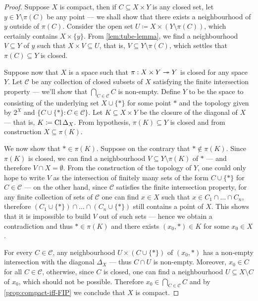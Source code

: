 \begin{proof}
Suppose \(X\) is compact, then if \(C \subseteq X \times Y\) is any closed set,
let \(y \in Y \setminus \pi(C)\) be any point --- we shall show that there
exists a neighbourhood of \(y\) outside of \(\pi(C)\). Consider the open set
\(U \coloneq X \times (Y \setminus \pi(C))\), which certainly contains
\(X \times \{y\}\). From \cref{lem:tube-lemma}, we find a neighbourhood
\(V \subseteq Y\) of \(y\) such that \(X \times V \subseteq U\), that is,
\(V \subseteq Y \setminus \pi(C)\), which settles that \(\pi(C) \subseteq Y\) is
closed.

Suppose now that \(X\) is a space such that \(\pi: X \times Y \twoheadrightarrow Y\) is closed
for any space \(Y\). Let \(\mathcal{C}\) be any collection of closed subsets of
\(X\) satisfying the finite intersection property --- we'll show that
\(\bigcap_{C \in \mathcal{C}} C\) is non-empty. Define \(Y\) to be the space to
consisting of the underlying set \(X \cup \{*\}\) for some point \(*\) and the
topology given by \(2^X\) and \(\{C \cup \{*\} \colon C \in \mathcal{C}\}\). Let
\(K \subseteq X \times Y\) be the closure of the diagonal of \(X\) --- that is,
\(K \coloneq \operatorname{Cl} \Delta_X\). From hypothesis, \(\pi(K) \subseteq Y\) is
closed and from construction \(X \subseteq \pi(K)\).

We now show that \(* \in \pi(K)\). Suppose on the contrary that
\(* \notin \pi(K)\). Since \(\pi(K)\) is closed, we can find a neighbourhood
\(V \subseteq Y \setminus \pi(K)\) of \(*\) --- and therefore
\(V \cap X = \emptyset\). From the construction of the topology of \(Y\), one
could only hope to write \(V\) as the intersection of finitely many sets of the
form \(C \cup \{*\}\) for \(C \in \mathcal{C}\) --- on the other hand, since
\(\mathcal{C}\) satisfies the finite intersection property, for any finite
collection of sets of \(\mathcal{C}\) one can find \(x \in X\) such that
\(x \in C_1 \cap \dots \cap C_n\), therefore
\((C_1 \cup \{*\}) \cap \dots \cap (C_n \cup \{*\})\) still contains a point of
\(X\). This shows that it is impossible to build \(V\) out of such sets ---
hence we obtain a contradiction and thus \(* \in \pi(K)\) and there exists
\((x_0, *) \in K\) for some \(x_0 \in X\).

For every \(C \in \mathcal{C}\), any neighbourhood \(U \times (C \cup \{*\})\)
of \((x_0, *)\) has a non-empty intersection with the diagonal \(\Delta_X\) ---
thus \(C \cap U\) is non-empty. Moreover, \(x_0 \in C\) for all
\(C \in \mathcal{C}\), otherwise, since \(C\) is closed, one can find a
neighbourhood \(U \subseteq X \setminus C\) of \(x_0\), which should not be
possible. Therefore \(x_0 \in \bigcap_{C \in \mathcal{C}} C\) and by
\cref{prop:compact-iff-FIP} we conclude that \(X\) is compact.
\end{proof}


